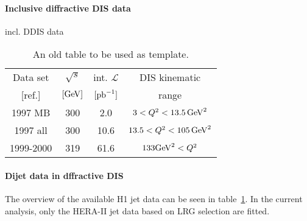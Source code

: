 \documentclass[12pt]{article}
\begin{document}
\paragraph{Inclusive diffractive DIS data}
incl. DDIS data


\begin{table}[tbhp]
  \footnotesize
  \begin{center}
    \begin{tabular}{cccc}
      \hline
      \multicolumn{1}{c}{Data set} & $\sqrt{s}$ & int. $\mathcal{L}$ & DIS kinematic  \\  
      \multicolumn{1}{c}{[ref.]}  & $[\mathrm{GeV}]$   & $[{\rm pb}^{-1}]$  &  range         \\   
      \hline
      1997 MB   & 300 & 2.0 & $3<Q^{2}<13.5\,\mathrm{GeV}^2$   \\
      1997 all  & 300 & 10.6 & $13.5<Q^{2}<105\,\mathrm{GeV}^2$   \\
      1999-2000 & 319 & 61.6 & $133\mathrm{GeV}^2 < Q^{2} $   \\
    \end{tabular}
    \caption{
      An old table to be used as template.
    }
    \label{tab:datasetsJets}
    \end{center}
\end{table}




\paragraph{Dijet data in dffractive DIS}
The overview of the available H1 jet data can be seen in table~\ref{tab:datasetsJets}.
In the current analysis, only the HERA-II jet data based on LRG selection are fitted.
\end{document}
